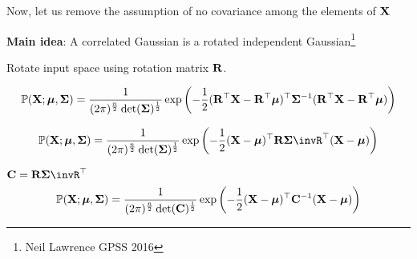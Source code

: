 \documentclass{beamer}
\begin{document}
\begin{frame}
	\footnotesize
	Now, let us remove the assumption of no covariance among the elements of $\mathbf{X}$
	
	\textbf{Main idea}: A correlated Gaussian is a rotated independent Gaussian\footnote{Neil Lawrence GPSS 2016}
	
	
	Rotate input space using rotation matrix $\mathbf{R}$.
	
		\begin{gather}
		\mathbb{P}(\mathbf{X} ; \boldsymbol{\mu}, \boldsymbol{\Sigma})=\frac{1}{(2 \pi)^{\frac{n}{2}}\operatorname{det}(\boldsymbol{\Sigma})^{\frac{1}{2}}} \exp \left(-\frac{1}{2}(\mathbf{R}^\top\mathbf{X}-\mathbf{R}^\top\boldsymbol{\mu})^\top \boldsymbol{\Sigma}^{-1}(\mathbf{R}^\top\mathbf{X}-\mathbf{R}^\top\boldsymbol{\mu})\right)
	\end{gather}

	
\begin{gather}
	\Prob(\mX ; \vmu, \mSigma)=\frac{1}{(2 \pi)^{\frac{n}{2}}\det(\mSigma)^{\frac{1}{2}}} \exp \left(-\frac{1}{2}(\mX-\vmu)\tp \mR\mSigma\invR\tp(\mX-\vmu)\right)
\end{gather}
	
	
\end{frame}

\begin{frame}
	
	$\mC = \mR\mSigma\invR\tp$
\begin{gather}
	\mathbb{P}(\mathbf{X} ; \boldsymbol{\mu}, \boldsymbol{\Sigma})=\frac{1}{(2 \pi)^{\frac{n}{2}}\operatorname{det}(\mathbf{C})^{\frac{1}{2}}} \exp \left(-\frac{1}{2}(\mathbf{X}-\boldsymbol{\mu})^\top \mathbf{C}^{-1}(\mathbf{X}-\boldsymbol{\mu})\right)
\end{gather}
\end{frame}
\end{document}
